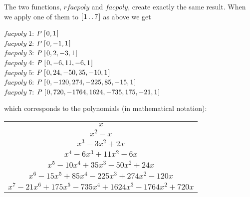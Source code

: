 \documentclass[tikz]{scrreprt}
\newcommand{\Conid}[1]{\mathit{#1}}
\newcommand{\Varid}[1]{\mathit{#1}}
\begin{document}
The two functions, \ensuremath{\Varid{rfacpoly}} and \ensuremath{\Varid{facpoly}},
create exactly the same result.
When we apply one of them to \ensuremath{[\mskip1.5mu \mathrm{1}\mathinner{\ldotp\ldotp}\mathrm{7}\mskip1.5mu]} 
as above we get

\begin{minipage}{\textwidth}
\ensuremath{\Varid{facpoly}\;\mathrm{1}}: \ensuremath{\Conid{P}\;[\mskip1.5mu \mathrm{0},\mathrm{1}\mskip1.5mu]}\\
\ensuremath{\Varid{facpoly}\;\mathrm{2}}: \ensuremath{\Conid{P}\;[\mskip1.5mu \mathrm{0},\mathbin{-}\mathrm{1},\mathrm{1}\mskip1.5mu]}\\ 
\ensuremath{\Varid{facpoly}\;\mathrm{3}}: \ensuremath{\Conid{P}\;[\mskip1.5mu \mathrm{0},\mathrm{2},\mathbin{-}\mathrm{3},\mathrm{1}\mskip1.5mu]}\\ 
\ensuremath{\Varid{facpoly}\;\mathrm{4}}: \ensuremath{\Conid{P}\;[\mskip1.5mu \mathrm{0},\mathbin{-}\mathrm{6},\mathrm{11},\mathbin{-}\mathrm{6},\mathrm{1}\mskip1.5mu]}\\ 
\ensuremath{\Varid{facpoly}\;\mathrm{5}}: \ensuremath{\Conid{P}\;[\mskip1.5mu \mathrm{0},\mathrm{24},\mathbin{-}\mathrm{50},\mathrm{35},\mathbin{-}\mathrm{10},\mathrm{1}\mskip1.5mu]}\\ 
\ensuremath{\Varid{facpoly}\;\mathrm{6}}: \ensuremath{\Conid{P}\;[\mskip1.5mu \mathrm{0},\mathbin{-}\mathrm{120},\mathrm{274},\mathbin{-}\mathrm{225},\mathrm{85},\mathbin{-}\mathrm{15},\mathrm{1}\mskip1.5mu]}\\
\ensuremath{\Varid{facpoly}\;\mathrm{7}}: \ensuremath{\Conid{P}\;[\mskip1.5mu \mathrm{0},\mathrm{720},\mathbin{-}\mathrm{1764},\mathrm{1624},\mathbin{-}\mathrm{735},\mathrm{175},\mathbin{-}\mathrm{21},\mathrm{1}\mskip1.5mu]} 
\end{minipage}

which corresponds to the polynomials (in mathematical notation):

\begin{center}
\begin{tabular}{c}
$x$ \\
$x^2 - x$ \\
$x^3 - 3x^2 + 2x$ \\
$x^4 - 6x^3 + 11x^2 - 6x$ \\
$x^5 - 10x^4 + 35x^3 -50x^2 + 24x$ \\
$x^6 - 15x^5 + 85x^4 - 225x^3 + 274x^2 -120x$ \\
$ x^7 - 21x^6 + 175x^5 - 735x^4 + 1624x^3 - 1764x^2 + 720x$  
\end{tabular}
\end{center}
\end{document}
